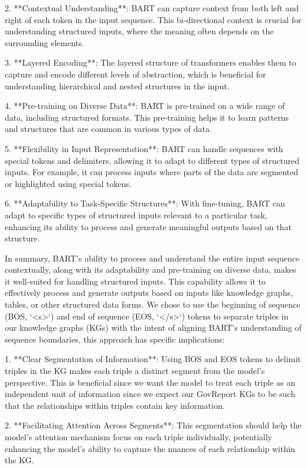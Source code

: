 \documentclass[12pt]{article}
\begin{document}
2. **Contextual Understanding**: BART can capture context from both left and right of each token in the input sequence. This bi-directional context is crucial for understanding structured inputs, where the meaning often depends on the surrounding elements.

3. **Layered Encoding**: The layered structure of transformers enables them to capture and encode different levels of abstraction, which is beneficial for understanding hierarchical and nested structures in the input.

4. **Pre-training on Diverse Data**: BART is pre-trained on a wide range of data, including structured formats. This pre-training helps it to learn patterns and structures that are common in various types of data.

5. **Flexibility in Input Representation**: BART can handle sequences with special tokens and delimiters, allowing it to adapt to different types of structured inputs. For example, it can process inputs where parts of the data are segmented or highlighted using special tokens.

6. **Adaptability to Task-Specific Structures**: With fine-tuning, BART can adapt to specific types of structured inputs relevant to a particular task, enhancing its ability to process and generate meaningful outputs based on that structure.

In summary, BART's ability to process and understand the entire input sequence contextually, along with its adaptability and pre-training on diverse data, makes it well-suited for handling structured inputs. This capability allows it to effectively process and generate outputs based on inputs like knowledge graphs, tables, or other structured data forms.
We chose to use the beginning of sequence (BOS, `<s>`) and end of sequence (EOS, `</s>`) tokens to separate triples in our knowledge graphs (KGs) with the intent of aligning BART's understanding of sequence boundaries, this approach has specific implications:

1. **Clear Segmentation of Information**: Using BOS and EOS tokens to delimit triples in the KG makes each triple a distinct segment from the model's perspective. This is beneficial since we want the model to treat each triple as an independent unit of information since we expect our GovReport KGs to be such that the relationships within triples contain key information.

2. **Facilitating Attention Across Segments**: This segmentation should help the model's attention mechanism focus on each triple individually, potentially enhancing the model's ability to capture the nuances of each relationship within the KG.
\end{document}

